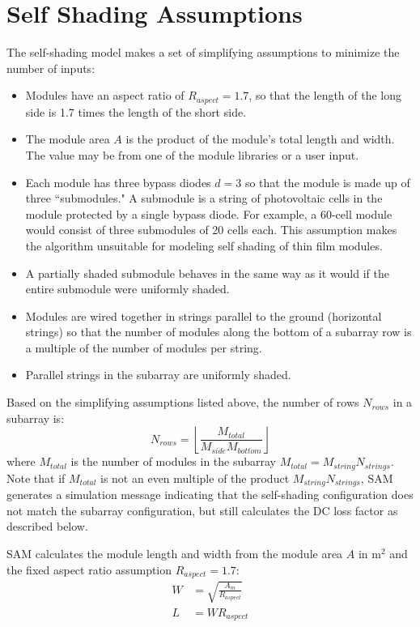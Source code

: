 \documentclass[12pt,letterpaper]{article}
\begin{document}
\section{Self Shading Assumptions}\label{sec-selfshadgeom}

The self-shading model makes a set of simplifying assumptions to minimize the number of inputs:

\begin{itemize}
\item Modules have an aspect ratio of $R_{aspect}=1.7$, so that the length of the long side is 1.7 times the length of the short side. 
\item The module area $A$ is the product of the module's total length and width. The value may be from one of the module libraries or a user input.
\item Each module has three bypass diodes $d=3$ so that the module is made up of three ``submodules." A submodule is a string of photovoltaic cells in the module protected by a single bypass diode. For example, a 60-cell module would consist of three submodules of 20 cells each. This assumption makes the algorithm unsuitable for modeling self shading of thin film modules.
\item A partially shaded submodule behaves in the same way as it would if the entire submodule were uniformly shaded.
\item Modules are wired together in strings parallel to the ground (horizontal strings) so that the number of modules along the bottom of a subarray row is a multiple of the number of modules per string.
\item Parallel strings in the subarray are uniformly shaded.
\end{itemize}

Based on the simplifying assumptions listed above, the number of rows $N_{rows}$ in a subarray is:
\begin{equation}
N_{rows} = \left\lfloor \frac{M_{total}}{M_{side} M_{bottom}} \right\rfloor
\end{equation}
where $M_{total}$ is the number of modules in the subarray $M_{total}=M_{string}N_{strings}$. Note that if $M_{total}$ is not an even multiple of the product $M_{string}N_{strings}$, SAM generates a simulation message indicating that the self-shading configuration does not match the subarray configuration, but still calculates the DC loss factor as described below.

SAM calculates the module length and width from the module area $A$ in $\text{m}^2$  and the fixed aspect ratio assumption  $R_{aspect}=1.7$:
\begin{align}
W &= \sqrt{ \frac{A_m}{R_{aspect}}}\\
L &= W \mathit{R_{aspect}}
\end{align}
\end{document}
